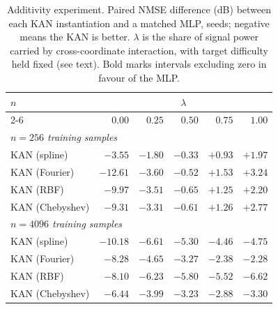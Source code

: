 \begin{table}[t]
\centering
\caption{Additivity experiment. Paired NMSE difference (dB) between each KAN instantiation and a matched MLP, \protect seeds; negative means the KAN is better. $\lambda$ is the share of signal power carried by cross-coordinate interaction, with target difficulty held fixed (see text). Bold marks intervals excluding zero in favour of the MLP.}
\label{tab:coche}
\small
\setlength{\tabcolsep}{4pt}
\begin{tabular}{lrrrrr}
\toprule
$n$ & \multicolumn{5}{c}{$\lambda$} \\
\cmidrule(lr){2-6}
 & $0.00$ & $0.25$ & $0.50$ & $0.75$ & $1.00$ \\
\midrule
\multicolumn{6}{l}{\textit{$n=256$ training samples}} \\
KAN (spline) & $-3.55$ & $-1.80$ & $-0.33$ & $\mathbf{+0.93}$ & $\mathbf{+1.97}$ \\
KAN (Fourier) & $-12.61$ & $-3.60$ & $-0.52$ & $\mathbf{+1.53}$ & $\mathbf{+3.24}$ \\
KAN (RBF) & $-9.97$ & $-3.51$ & $-0.65$ & $\mathbf{+1.25}$ & $\mathbf{+2.20}$ \\
KAN (Chebyshev) & $-9.31$ & $-3.31$ & $-0.61$ & $\mathbf{+1.26}$ & $\mathbf{+2.77}$ \\
\midrule
\multicolumn{6}{l}{\textit{$n=4096$ training samples}} \\
KAN (spline) & $-10.18$ & $-6.61$ & $-5.30$ & $-4.46$ & $-4.75$ \\
KAN (Fourier) & $-8.28$ & $-4.65$ & $-3.27$ & $-2.38$ & $-2.28$ \\
KAN (RBF) & $-8.10$ & $-6.23$ & $-5.80$ & $-5.52$ & $-6.62$ \\
KAN (Chebyshev) & $-6.44$ & $-3.99$ & $-3.23$ & $-2.88$ & $-3.30$ \\
\bottomrule
\end{tabular}
\end{table}

